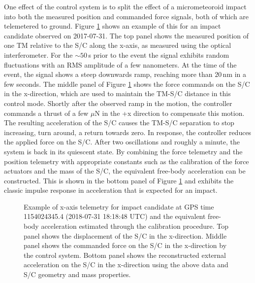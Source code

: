 \documentclass[twocolumn, trackchanges]{aastex62}
\begin{document}
One effect of the control system is to split the effect of a micrometeoroid impact into both the measured position and commanded force signals, both of which are telemetered to ground. Figure \ref{fig:calExample} shows an example of this for an impact candidate observed on 2017-07-31.  The top panel shows the measured position of one TM relative to the S/C along the x-axis, as measured using the optical interferometer.  For the  $\sim50\,$s prior to the event the signal exhibits random fluctuations with an RMS amplitude of a few nanometers. At the time of the event, the signal shows a steep downwards ramp, reaching more than $20\,$nm in a few seconds.  The middle panel of Figure \ref{fig:calExample} shows the force commands on the S/C in the x-direction, which are used to maintain the TM-S/C distance in this control mode. Shortly after the observed ramp in the motion, the controller commands a thrust of a few $\mu$N in the +x direction to compensate this motion.  The resulting acceleration of the S/C causes the TM-S/C separation to stop increasing, turn around, a return towards zero. In response, the controller reduces the applied force on the S/C. After two oscillations and roughly a minute, the system is back in its quiescent state.  By combining the force telemetry and the position telemetry with appropriate constants such as the calibration of the force actuators and the mass of the S/C, the equivalent free-body acceleration can be constructed. This is shown in the bottom panel of Figure \ref{fig:calExample} and exhibits the classic impulse response in acceleration that is expected for an impact. 

\begin{figure}
\vspace*{-10mm}
\caption{Example of x-axis telemetry for impact candidate at GPS time 1154024345.4 (2018-07-31 18:18:48 UTC) and the equivalent free-body acceleration estimated through the calibration procedure. Top panel shows the displacement of the S/C in the x-direction. Middle panel shows the commanded force on the S/C in the x-direction by the control system. Bottom panel shows the reconstructed external acceleration on the S/C in the x-direction using the above data and S/C geometry and mass properties. \label{fig:calExample}}
\end{figure}
\end{document}
